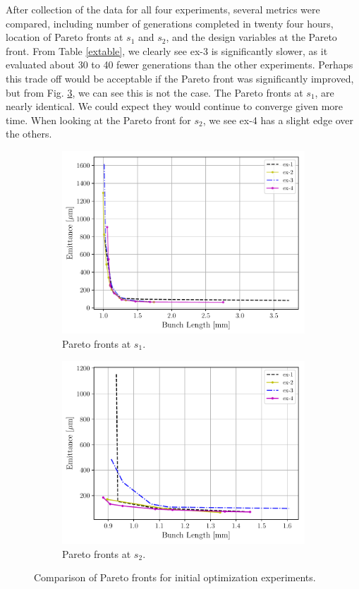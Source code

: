 After collection of the data for all four experiments, several metrics
were compared, including number of generations completed in twenty four hours,
location of Pareto fronts at $s_1$ and $s_2$, and the design variables at the Pareto front. From Table \ref{extable}, we clearly see ex-3 is significantly 
slower, as it evaluated about 30 to 40 fewer generations than the other experiments.
Perhaps this trade off would be acceptable if the Pareto front was significantly 
improved, but from Fig. \ref{expareto}, we can see this is not the case.
The Pareto fronts at $s_1$, are nearly identical. We could expect
they would continue to converge given more time. 
When looking at the Pareto front for $s_2$, we see ex-4 has a slight 
edge over the others.  
\begin{figure}
	\centering
	\begin{subfigure}{0.49\textwidth}
		\centering
		\includegraphics[width=\textwidth]{Report/ex-pareto1}
		\caption{Pareto fronts at $s_1$.}
		\label{expareto1}
	\end{subfigure}
	\begin{subfigure}{0.49\textwidth}
	\centering
	\includegraphics[width=\textwidth]{Report/ex-pareto2}
	\caption{Pareto fronts at $s_2$.}
	\label{expareto2}
	\end{subfigure}
	\caption{Comparison of Pareto fronts for initial optimization experiments.}
	\label{expareto}
\end{figure}


